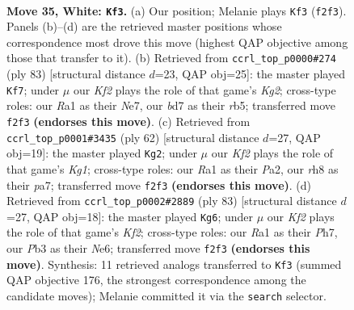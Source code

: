 \documentclass[11pt]{article}
\begin{document}
\clearpage

\begin{figure}[p]\centering
\begin{subfigure}{0.46\textwidth}\centering
\resizebox{\linewidth}{!}{%
\newchessgame
\chessboard[
  setfen={7r/3bk3/1p6/p3p3/P3N3/1P4P1/5K2/R7 w - - 0 35},
  showmover=false,
  pgfstyle=straightmove, color=movearrow, markmove={f2-f3}
]}
\caption{}
\end{subfigure}\hfill
\begin{subfigure}{0.46\textwidth}\centering
\resizebox{\linewidth}{!}{%
\newchessgame
\chessboard[
  setfen={8/4n1k1/4p1p1/1R1p4/6PP/p1b5/B5K1/8 b - - 0 42},
  showmover=false,
  pgfstyle=straightmove, color=movearrow, markmove={g7-f7}
]}
\caption{}
\end{subfigure}
\\[4pt]
\begin{subfigure}{0.46\textwidth}\centering
\resizebox{\linewidth}{!}{%
\newchessgame
\chessboard[
  setfen={6k1/p1br4/6pp/8/8/5NP1/P4P1P/1R4K1 w - - 2 32},
  showmover=false,
  pgfstyle=straightmove, color=movearrow, markmove={g1-g2}
]}
\caption{}
\end{subfigure}\hfill
\begin{subfigure}{0.46\textwidth}\centering
\resizebox{\linewidth}{!}{%
\newchessgame
\chessboard[
  setfen={8/5k1p/4np2/6p1/4P1P1/4BP2/4K2P/8 b - - 6 42},
  showmover=false,
  pgfstyle=straightmove, color=movearrow, markmove={f7-g6}
]}
\caption{}
\end{subfigure}
\caption{\textbf{Move 35, White: \texttt{Kf3}.} (a) Our position; Melanie plays \texttt{Kf3} (\texttt{f2f3}). Panels (b)--(d) are the retrieved master positions whose correspondence most drove this move (highest QAP objective among those that transfer to it). (b) Retrieved from \texttt{ccrl\_top\_p0000\#274} (ply 83) [structural distance $d$=23, QAP obj=25]: the master played \texttt{Kf7}; under $\mu$ our \emph{Kf2} plays the role of that game's \emph{Kg2}; cross-type roles: our \emph{R}a1 as their \emph{N}e7, our \emph{b}d7 as their \emph{r}b5; transferred move \texttt{f2f3} \textbf{(endorses this move)}. (c) Retrieved from \texttt{ccrl\_top\_p0001\#3435} (ply 62) [structural distance $d$=27, QAP obj=19]: the master played \texttt{Kg2}; under $\mu$ our \emph{Kf2} plays the role of that game's \emph{Kg1}; cross-type roles: our \emph{R}a1 as their \emph{P}a2, our \emph{r}h8 as their \emph{p}a7; transferred move \texttt{f2f3} \textbf{(endorses this move)}. (d) Retrieved from \texttt{ccrl\_top\_p0002\#2889} (ply 83) [structural distance $d$=27, QAP obj=18]: the master played \texttt{Kg6}; under $\mu$ our \emph{Kf2} plays the role of that game's \emph{Kf2}; cross-type roles: our \emph{R}a1 as their \emph{P}h7, our \emph{P}b3 as their \emph{N}e6; transferred move \texttt{f2f3} \textbf{(endorses this move)}. Synthesis: 11 retrieved analogs transferred to \texttt{Kf3} (summed QAP objective 176, the strongest correspondence among the candidate moves); Melanie committed it via the \texttt{search} selector.}
\label{fig:thought-m68}
\end{figure}
\end{document}

